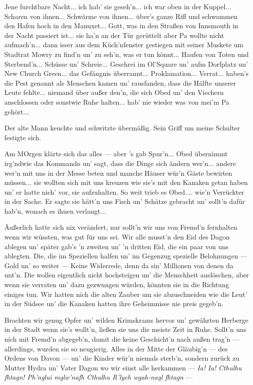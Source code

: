 \glqq Jene furchtbare Nacht... ich hab' sie geseh'n... ich war oben in der Kuppel... Scharen von ihnen... Schwärme von ihnen... über's ganze Riff und schwammen den Hafen hoch in den Manuxet... Gott, was in den Straßen von Innsmouth in der Nacht passiert ist... sie ha'n an der Tür gerüttelt aber Pa wollte nicht aufmach'n... dann isser aus dem Küch'nfenster gestiegen mit seiner Muskete um Stadtrat Mowry zu find'n un' zu seh'n, was er tun könnt... Haufen von Toten und Sterbend'n... Schüsse un' Schreie... Geschrei im Ol'Square un' aufm Dorfplatz un' New Church Green... das Gefängnis überrannt... Proklamation... Verrat... haben's die Pest genannt als Menschen kamen un' rausfanden, dass die Hälfte unserer Leute fehlte... niemand über außer den'n, die sich Obed un' den Viechern anschlossen oder sonstwie Ruhe halten... hab' nie wieder was von mei'm Pa gehört...\grqq

Der alte Mann keuchte und schwitzte übermäßig. Sein Griff um meine Schulter festigte sich.

\glqq Am MOrgen klärte sich das alles --- aber 's gab Spur'n... Obed übernimmt irg'ndwie das Kommando un' sagt, dass die Dinge sich ändern wer'n... andere wer'n mit uns in der Messe beten und manche Häuser wür'n Gäste bewirten müssen... sie wollten sich mit uns kreuzen wie sie's mit den Kanaken getan haben un' er hatte nich' vor, sie aufzuhalten. So weit trieb es Obed.... wie'n Verrückter in der Sache. Er sagte sie hätt'n uns Fisch un' Schätze gebracht un' sollt'n dafür hab'n, wonach es ihnen verlangt...

Äußerlich hatte sich nix verändert, nur sollt'n wir uns von Fremd'n fernhalten wenn wir wüssten, was gut für uns sei. Wir alle musst'n den Eid des Dagon ablegen un' später gab's 'n zweiten un' 'n dritten Eid, die ein paar von uns ablegten. Die, die im Speziellen halfen un' im Gegenzug spezielle Belohnungen --- Gold un' so weiter --- Keine Widerrede, denn da sin' Millionen von denen da unt'n. Die wollen eigentlich nicht hochsteigen un' die Menschheit auslöschen, aber wenn sie verraten un' dazu gezwungen würden, könnten sie in die Richtung einiges tun. Wir hatten nich die alten Zauber um sie abzuschneiden wie die Leut' in der Südsee un' die Kanaken hatten ihre Geheimnisse nie preis gegeb'n.

Brachten wir genug Opfer un' wilden Krimskrams hervor un' gewährten Herberge in der Stadt wenn sie's wollt'n, ließen sie uns die meiste Zeit in Ruhe. Sollt'n uns nich mit Fremd'n abgegeb'n, damit die keine Geschicht'n nach außen trag'n --- allerdings, wurden sie so neugierig. Alles in der Mitte der Gläubig'n --- des Ordens von Davon --- un' die Kinder wür'n niemals sterb'n, sondern zurück zu Mutter Hydra un' Vater Dagon wo wir einst alle herkammen --- \textit{Ia! Ia! Cthulhu fhtagn! Ph’nglui mglw’nafh Cthulhu R’lyeh wgah-nagl fhtagn} ---
\grqq

